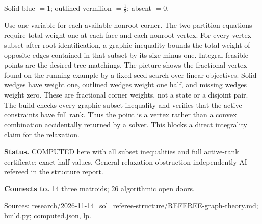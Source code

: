 \documentclass[10pt,a4paper]{amsart}
\begin{document}
\begin{center}
\begin{minipage}{.86\textwidth}
\par Solid blue $=1$; outlined vermilion $=\frac12$; absent $=0$.
\end{minipage}\end{center}
Use one variable for each available nonroot corner. The two partition equations require total weight one at each face and each nonroot vertex. For every vertex subset after root identification, a graphic inequality bounds the total weight of opposite edges contained in that subset by its size minus one. Integral feasible points are the desired tree matchings. The picture shows the fractional vertex found on the running example by a fixed-seed search over linear objectives. Solid wedges have weight one, outlined wedges weight one half, and missing wedges weight zero. These are fractional corner weights, not a state or a disjoint pair. The build checks every graphic subset inequality and verifies that the active constraints have full rank. Thus the point is a vertex rather than a convex combination accidentally returned by a solver. This blocks a direct integrality claim for the relaxation.

\textbf{Status.} COMPUTED here with all subset inequalities and full active-rank certificate; exact half values. General relaxation obstruction independently AI-refereed in the structure report.

\textbf{Connects to.} 14 three matroids; 26 algorithmic open doors.

{\footnotesize\raggedright Sources: research/\allowbreak{}2026-11-14\_sol\_referee-structure/\allowbreak{}REFEREE-graph-theory.md;\allowbreak{} build.py;\allowbreak{} computed.json, lp.\par}
\end{document}
